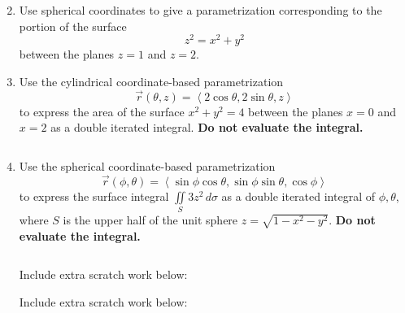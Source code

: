 \documentclass[12pt]{article}
\newcommand{\up}{$~$\vspace*{-0.7in}}
\newcommand{\liner}{\noindent\underline{\hspace*{7in}}}
\begin{document}
\begin{enumerate}
\liner

\newpage\up


\item Use spherical coordinates to give a parametrization corresponding to the portion of the surface \[z^2=x^2+y^2\] between the planes $z=1$ and $z=2$.

\vspace*{8.5in}

\liner

\newpage


\item Use the cylindrical coordinate-based parametrization \[\vec{r}(\theta,z)=\left<2\cos\theta,2\sin\theta,z\right>\] to express the area of the surface $x^2+y^2=4$ between the planes $x=0$ and $x=2$ as a double iterated integral. \textbf{Do not evaluate the integral.}

\vspace*{8in}

\liner

\newpage\up


\item Use the spherical coordinate-based parametrization \[\vec{r}(\phi,\theta)=\left<\sin\phi\cos\theta,\sin\phi\sin\theta,\cos\phi\right>\] to express the surface integral $\iint\limits_S 3z^2\,d\sigma$ as a double iterated integral of $\phi,\theta$, where $S$ is the upper half of the unit sphere $z=\sqrt{1-x^2-y^2}$. \textbf{Do not evaluate the integral.}

\vspace*{8in}

\liner

\newpage\up

\centerline{Include extra scratch work below:}
\liner
\newpage
\centerline{Include extra scratch work below:}
\liner

\end{enumerate}
\end{document}
